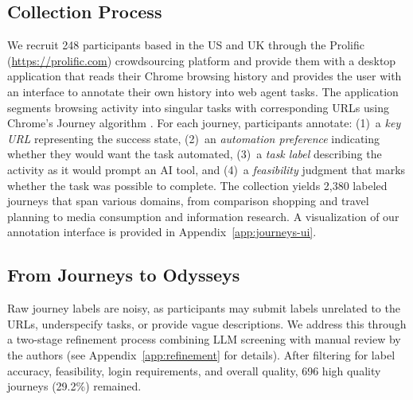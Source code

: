 \documentclass{article}
\theoremstyle{plain}
\theoremstyle{definition}
\theoremstyle{remark}
\begin{document}
\subsection{Collection Process}

We recruit 248 participants based in the US and UK through the Prolific (\url{https://prolific.com}) crowdsourcing platform and provide them with a desktop application that reads their Chrome browsing history and provides the user with an interface to annotate their own history into web agent tasks. The application segments browsing activity into singular tasks with corresponding URLs using Chrome's Journey algorithm \citep{google2022chrome_journeys}. For each journey, participants annotate: (1)~a \textit{key URL} representing the success state, (2)~an \textit{automation preference} indicating whether they would want the task automated, (3)~a \textit{task label} describing the activity as it would prompt an AI tool, and (4)~a \textit{feasibility} judgment that marks whether the task was possible to complete. The collection yields 2,380 labeled journeys that span various domains, from comparison shopping and travel planning to media consumption and information research. A visualization of our annotation interface is provided in Appendix~\ref{app:journeys-ui}.

\subsection{From Journeys to Odysseys} \label{sec:task-composition}

Raw journey labels are noisy, as participants may submit labels unrelated to the URLs, underspecify tasks, or provide vague descriptions. We address this through a two-stage refinement process combining LLM screening with manual review by the authors (see Appendix~\ref{app:refinement} for details). After filtering for label accuracy, feasibility, login requirements, and overall quality, 696 high quality journeys (29.2\%) remained.
\end{document}
